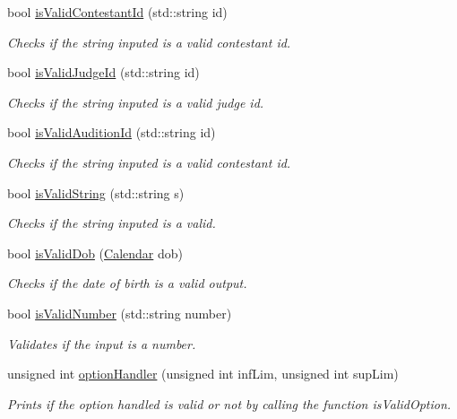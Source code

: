 \begin{DoxyCompactItemize}
bool \hyperlink{class_company_m_s_a2edd6d62bcef40920312bc967591a379}{is\+Valid\+Contestant\+Id} (std\+::string id)
\begin{DoxyCompactList}\small\item\em Checks if the string inputed is a valid contestant id. \end{DoxyCompactList}\item 
bool \hyperlink{class_company_m_s_af4f06b5d99b7cdc6cdca2f98f5a844d5}{is\+Valid\+Judge\+Id} (std\+::string id)
\begin{DoxyCompactList}\small\item\em Checks if the string inputed is a valid judge id. \end{DoxyCompactList}\item 
bool \hyperlink{class_company_m_s_a7d66e2ba526b647b95362c1c7a7e6f48}{is\+Valid\+Audition\+Id} (std\+::string id)
\begin{DoxyCompactList}\small\item\em Checks if the string inputed is a valid contestant id. \end{DoxyCompactList}\item 
bool \hyperlink{class_company_m_s_ade9c43ad96fb8806d1c76b0daae66cee}{is\+Valid\+String} (std\+::string s)
\begin{DoxyCompactList}\small\item\em Checks if the string inputed is a valid. \end{DoxyCompactList}\item 
bool \hyperlink{class_company_m_s_a030d1058d9196c1ac5cf1033e95e83c4}{is\+Valid\+Dob} (\hyperlink{class_calendar}{Calendar} dob)
\begin{DoxyCompactList}\small\item\em Checks if the date of birth is a valid output. \end{DoxyCompactList}\item 
bool \hyperlink{class_company_m_s_a3536b19cdf6f981d44f0fc2a6ff6446b}{is\+Valid\+Number} (std\+::string number)
\begin{DoxyCompactList}\small\item\em Validates if the input is a number. \end{DoxyCompactList}\item 
unsigned int \hyperlink{class_company_m_s_a91f5627674f301e51beb79eb6827e4d9}{option\+Handler} (unsigned int inf\+Lim, unsigned int sup\+Lim)
\begin{DoxyCompactList}\small\item\em Prints if the option handled is valid or not by calling the function is\+Valid\+Option. \end{DoxyCompactList}\item 

\end{DoxyCompactItemize}
